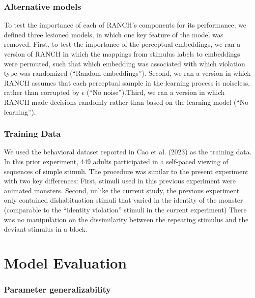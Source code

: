 \documentclass[10pt, letterpaper]{article}
\begin{document}
\hypertarget{alternative-models}{%
\subsubsection{Alternative models}\label{alternative-models}}

To test the importance of each of RANCH's components for its
performance, we defined three lesioned models, in which one key feature
of the model was removed. First, to test the importance of the
perceptual embeddings, we ran a version of RANCH in which the mappings
from stimulus labels to embeddings were permuted, such that which
embedding was associated with which violation type was randomized
(``Random embeddings''). Second, we ran a version in which RANCH assumes
that each perceptual sample in the learning process is noiseless, rather
than corrupted by \(\epsilon\) (``No noise'').Third, we ran a version in
which RANCH made decisions randomly rather than based on the learning
model (``No learning'').

\hypertarget{training-data}{%
\subsubsection{Training Data}\label{training-data}}

We used the behavioral dataset reported in Cao et al. (2023) as the
training data. In this prior experiment, 449 adults participated in a
self-paced viewing of sequences of simple stimuli. The procedure was
similar to the present experiment with two key differences: First,
stimuli used in this previous experiment were animated monsters. Second,
unlike the current study, the previous experiment only contained
dishabituation stimuli that varied in the identity of the monster
(comparable to the ``identity violation'' stimuli in the current
experiment) There was no manipulation on the dissimilarity between the
repeating stimulus and the deviant stimulus in a block.

\hypertarget{model-evaluation}{%
\section{Model Evaluation}\label{model-evaluation}}

\hypertarget{parameter-generalizability}{%
\subsubsection{Parameter
generalizability}\label{parameter-generalizability}}
\end{document}
